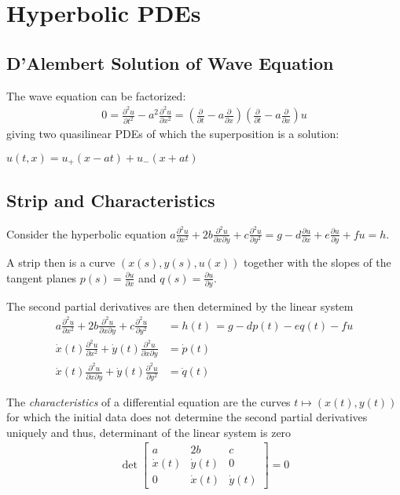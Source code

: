 \section{Hyperbolic PDEs}
\subsection{D'Alembert Solution of Wave Equation}
The wave equation can be factorized:
\begin{align*}
    0 = \frac{\partial^2 u}{\partial t^2} - a^2 \frac{\partial^2 u}{\partial x^2}
    = \left(
    \frac{\partial}{\partial t}-a\frac{\partial}{\partial x}
    \right)
    \left(
    \frac{\partial}{\partial t}-a\frac{\partial}{\partial x}
    \right)
    u
\end{align*}
giving two quasilinear PDEs of which the superposition is a solution:

$u(t,x) = u_+(x-at)+u_-(x+at)$

\subsection{Strip and Characteristics}

Consider the hyperbolic equation
\colorbox{shadecolor}{$
    \displaystyle
    a\frac{\partial^{2}u}{\partial x^{2}}+2b\frac{\partial^{2}u}{\partial x\partial y}+c\frac{\partial^{2}u}{\partial y^{2}}=g-d\frac{\partial u}{\partial x}+e\frac{\partial u}{\partial y}+f u=h.
$}

A strip then is a curve $(x(s), y(s), u(x))$ together with the slopes of the tangent planes
$p(s) = \frac{\partial u}{\partial x}$ and $q(s) = \frac{\partial u}{\partial y}$.

The second partial derivatives are then determined by the linear system
\begin{align*}
    a\frac{\partial^{2}u}{\partial x^{2}}+2b\frac{\partial^{2}u}{\partial x\partial y}
    + c\frac{\partial^{2}u}{\partial y^{2}} & = h(t)\,=g-d p(t)-e q(t)-f u \\
    \dot{x}(t)\frac{\partial^{2}u}{\partial x^{2}}+\dot{y}(t)\frac{\partial^{2}u}{\partial x\partial y} & = \dot{p}(t) \\
    \dot{x}(t)\frac{\partial^{2}u}{\partial x\partial y} + \dot{y}(t)\frac{\partial^{2}u}{\partial y^2} & = \dot{q}(t)
\end{align*}

The \emph{characteristics} of a differential equation are the curves $t\mapsto(x(t),y(t))$ for which the initial data
does not determine the second partial derivatives uniquely and thus, determinant of the linear system is zero
\begin{align*}
    \det
    \begin{bmatrix}
        a & 2b & c \\
        \dot{x}(t) & \dot{y}(t) & 0 \\
        0 & \dot{x}(t) & \dot{y}(t)
    \end{bmatrix}
    = 0
\end{align*}

